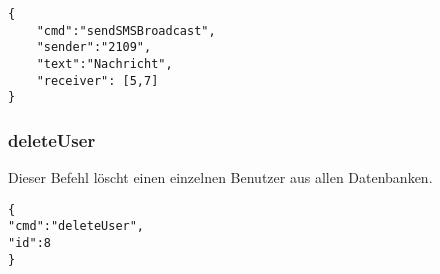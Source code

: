 \begin{lstlisting}[style=json]
{
	"cmd":"sendSMSBroadcast",
	"sender":"2109",
	"text":"Nachricht",
	"receiver": [5,7]
}
\end{lstlisting}

\subsubsection*{deleteUser}

Dieser Befehl löscht einen einzelnen Benutzer aus allen Datenbanken.

\begin{lstlisting}[style=json]
{
"cmd":"deleteUser",
"id":8
}
\end{lstlisting}